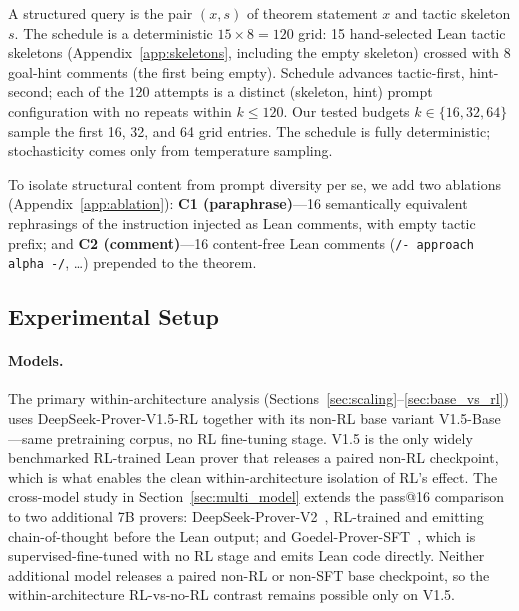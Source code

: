 \documentclass{article}
\begin{document}
A structured query is the pair $(x, s)$ of theorem statement $x$ and tactic skeleton $s$. The schedule is a deterministic $15{\times}8{=}120$ grid: 15 hand-selected Lean tactic skeletons (Appendix~\ref{app:skeletons}, including the empty skeleton) crossed with 8 goal-hint comments (the first being empty). Schedule advances tactic-first, hint-second; each of the 120 attempts is a distinct (skeleton, hint) prompt configuration with no repeats within $k{\leq}120$. Our tested budgets $k\in\{16,32,64\}$ sample the first 16, 32, and 64 grid entries. The schedule is fully deterministic; stochasticity comes only from temperature sampling.

To isolate structural content from prompt diversity per se, we add two ablations (Appendix~\ref{app:ablation}): \textbf{C1 (paraphrase)}---16 semantically equivalent rephrasings of the instruction injected as Lean comments, with empty tactic prefix; and \textbf{C2 (comment)}---16 content-free Lean comments (\texttt{/- approach alpha -/}, \dots) prepended to the theorem.

\subsection{Experimental Setup}
\label{sec:setup}

\paragraph{Models.}
The primary within-architecture analysis (Sections~\ref{sec:scaling}--\ref{sec:base_vs_rl}) uses DeepSeek-Prover-V1.5-RL together with its non-RL base variant V1.5-Base---same pretraining corpus, no RL fine-tuning stage. V1.5 is the only widely benchmarked RL-trained Lean prover that releases a paired non-RL checkpoint, which is what enables the clean within-architecture isolation of RL's effect. The cross-model study in Section~\ref{sec:multi_model} extends the pass@16 comparison to two additional 7B provers: DeepSeek-Prover-V2~\cite{deepseekv2prover}, RL-trained and emitting chain-of-thought before the Lean output; and Goedel-Prover-SFT~\cite{lin2025goedel}, which is supervised-fine-tuned with no RL stage and emits Lean code directly. Neither additional model releases a paired non-RL or non-SFT base checkpoint, so the within-architecture RL-vs-no-RL contrast remains possible only on V1.5.
\end{document}
